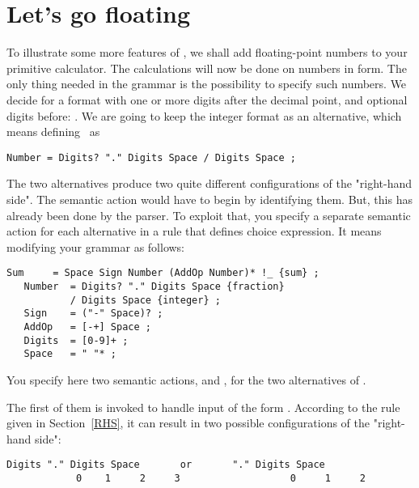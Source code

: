 \newpage

\section{Let's go floating}\label{Floating}


To illustrate some more features of \Mouse,
we shall add floating-point numbers to your primitive calculator.
The calculations will now be done on numbers in  form.
The only thing needed in the grammar is the possibility to specify such numbers.
We decide for a format with one or more digits after the decimal point,
and optional digits before: .
We are going to keep the integer format as an alternative, 
which means defining \Number\ as

\small
\begin{Verbatim}[samepage=true,xleftmargin=15mm,baselinestretch=0.8]
         Number = Digits? "." Digits Space / Digits Space ;
\end{Verbatim}
\normalsize

The two alternatives produce two quite different configurations of the "right-hand side".
The semantic action would have to begin by identifying them.
But, this has already been done by the parser.
To exploit that, you specify a separate semantic action
for each alternative in a rule that defines choice expression.
It means modifying your grammar as follows:
%
\small
\begin{Verbatim}[frame=single,framesep=2mm,samepage=true,xleftmargin=15mm,xrightmargin=15mm,baselinestretch=0.8]
   Sum     = Space Sign Number (AddOp Number)* !_ {sum} ;
   Number  = Digits? "." Digits Space {fraction}
           / Digits Space {integer} ; 
   Sign    = ("-" Space)? ;
   AddOp   = [-+] Space ;
   Digits  = [0-9]+ ;
   Space   = " "* ;
\end{Verbatim}
\normalsize
%
You specify here two semantic actions,  and , 
for the two alternatives of \Number.

The first of them is invoked to handle input of the form .
According to the rule given in Section~\ref{RHS}, it can result
in two possible configurations of the "right-hand side":
 
\small
\begin{Verbatim}[samepage=true,xleftmargin=15mm,baselinestretch=0.9]
         Digits "." Digits Space       or       "." Digits Space
            0    1     2     3                   0     1     2
\end{Verbatim}
\normalsize
 
